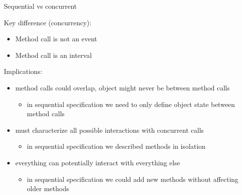 \begin{frame}{Sequential vs concurrent}

Key difference (concurrency):
\begin{itemize}
    \item Method call is not an event
    \item Method call is an interval
\end{itemize}

\pause
Implications:
\pause
\begin{itemize}
  \item method calls could overlap, object might never be between method calls
  \begin{itemize}
    \pause
    \item in sequential specification we need to only define object state between method calls
  \end{itemize}
  \pause

  \item must characterize all possible interactions with concurrent calls 
  \begin{itemize}
    \pause
    \item in sequential specification we described methods in isolation
  \end{itemize}

  \pause

  \item everything can potentially interact with everything else
  \begin{itemize}
    \pause
    \item in sequential specification we could add new methods without affecting older methods
  \end{itemize}
\end{itemize}

\pause
{}

\end{frame}


